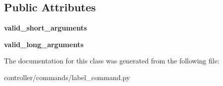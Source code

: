 \subsection*{Public Attributes}
\begin{DoxyCompactItemize}
\item 
\mbox{\label{classmodules_1_1controller_1_1commands_1_1label__command_1_1_label_command_a822f83ec7884a77efee9fd3992259b69}} 
{\bfseries valid\+\_\+short\+\_\+arguments}
\item 
\mbox{\label{classmodules_1_1controller_1_1commands_1_1label__command_1_1_label_command_a608a4e673b7e7d42d0c4909f2c6a3ed4}} 
{\bfseries valid\+\_\+long\+\_\+arguments}
\end{DoxyCompactItemize}


The documentation for this class was generated from the following file\+:\begin{DoxyCompactItemize}
\item 
controller/commands/label\+\_\+command.\+py\end{DoxyCompactItemize}
